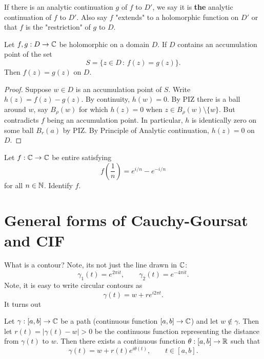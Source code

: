 \documentclass[10pt, a4paper]{article}
\begin{document}
If there is an analytic continuation $g$ of $f$ to $D'$,
we say it is \textbf{the} analytic continuation of $f$ to $D'$.
Also say $f$ "extends" to a holomorphic function on $D'$ or that $f$ is the "restriction" of $g$ to $D$.

\begin{theorem}
    Let $f, g : D \to \mathbb{C}$ be holomorphic on a domain $D$.
    If $D$ contains an accumulation point of the set
    \[
    S = \{z \in D\,:\, f(z) = g(z)\}.
    \]
    Then $f(z) = g(z)$ on $D$.

    \begin{proof}
        Suppose $w \in D$ is an accumulation point of $S$.
        Write $h(z) = f(z) - g(z)$.
        By continuity,
        $h(w) = 0$.
        By PIZ there is a ball around $w$,
        say $B_{\rho}(w)$ for which $h(z) = 0$ when $z \in B_{\rho}(w) \setminus \{w\}$.
        But contradicts $f$ being an accumulation point.
        In particular,
        $h$ is identically zero on some ball $B_r(a)$ by PIZ.
        By Principle of Analytic continuation,
        $h(z) = 0$ on $D$.
    \end{proof}
\end{theorem}

\begin{example}
    Let $f : \mathbb{C} \to \mathbb{C}$ be entire satisfying
    \[
    f\left(\frac{1}{n}\right) = e ^ {i / n} - e ^ {-i / n}
    \]
    for all $n \in \mathbb{N}$.
    Identify $f$.
\end{example}

\newpage

\section{General forms of Cauchy-Goursat and CIF}

What is a contour?
Note,
its not just the line drawn in $\mathbb{C}$:
\[
\gamma_1(t) = e ^ {2\pi it},\qquad \gamma_2(t) = e ^ {-4\pi it}.
\]
Note,
it is easy to write circular contours as
\[
\gamma(t) = w + re ^ {i2\pi t}.
\]
It turns out
\begin{theorem}
    Let $\gamma : [a, b] \to \mathbb{C}$ be a path
    (continuous function $[a, b] \to \mathbb{C}$)
    and let $w \notin \gamma$.
    Then let $r(t) = |\gamma(t) - w| > 0$ be the continuous function representing the distance from $\gamma(t)$ to $w$.
    Then there exists a continuous function $\theta : [a, b] \to \mathbb{R}$ such that
    \[
    \gamma(t) = w + r(t)e ^ {i\theta(t)},\qquad t \in [a, b].
    \]
\end{theorem}
\end{document}
